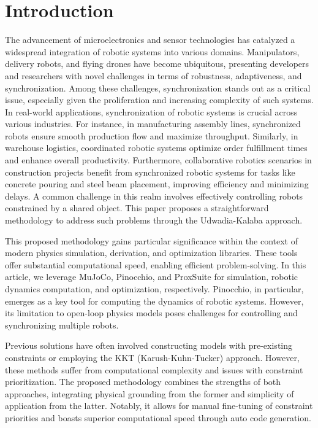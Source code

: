 \chapter{Introduction}
\label{chap:intro}

The advancement of microelectronics and sensor technologies has catalyzed a 
widespread integration of robotic systems into various domains. Manipulators, 
delivery robots, and flying drones have become ubiquitous, presenting developers 
and researchers with novel challenges in terms of robustness, adaptiveness, and 
synchronization. Among these challenges, synchronization stands out as a critical 
issue, especially given the proliferation and increasing complexity of such systems. 
 In real-world applications, synchronization of robotic systems is crucial across 
various industries. For instance, in manufacturing assembly lines, synchronized 
robots ensure smooth production flow and maximize throughput. Similarly, in 
warehouse logistics, coordinated robotic systems optimize order fulfillment times 
and enhance overall productivity. Furthermore, collaborative robotics scenarios in 
construction projects benefit from synchronized robotic systems for tasks like 
concrete pouring and steel beam placement, improving efficiency and minimizing 
delays. A common challenge in this realm involves effectively controlling robots constrained 
by a shared object. This paper proposes a straightforward methodology to address 
such problems through the Udwadia-Kalaba\cite{UdwadiaKalabaApproach} approach.

This proposed methodology gains particular significance within the context of modern 
physics simulation, derivation, and optimization libraries. These tools offer 
substantial computational speed, enabling efficient problem-solving. In this article, 
we leverage MuJoCo\cite{MuJoCo}, Pinocchio\cite{Pinocchio}, and ProxSuite\cite{CvxPy} 
for simulation, robotic dynamics computation, and optimization, respectively. 
Pinocchio, in particular, emerges as a key tool for computing the dynamics of robotic 
systems. However, its limitation to open-loop physics models poses challenges for 
controlling and synchronizing multiple robots.

Previous solutions have often involved constructing models with pre-existing 
constraints or employing the KKT (Karush-Kuhn-Tucker) approach. However, these 
methods suffer from computational complexity and issues with constraint 
prioritization. The proposed methodology combines the strengths of both approaches, 
integrating physical grounding from the former and simplicity of application from 
the latter. Notably, it allows for manual fine-tuning of constraint priorities and 
boasts superior computational speed through auto code generation. 

